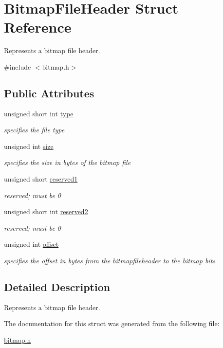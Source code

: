 \hypertarget{struct_bitmap_file_header}{}\section{Bitmap\+File\+Header Struct Reference}
\label{struct_bitmap_file_header}


Represents a bitmap file header.  




{\ttfamily \#include $<$bitmap.\+h$>$}

\subsection*{Public Attributes}
\begin{DoxyCompactItemize}
\item 
unsigned short int \mbox{\hyperlink{group__bitmap_ga0206e64e29930b0594e714cbdf8090f0}{type}}
\begin{DoxyCompactList}\small\item\em specifies the file type \end{DoxyCompactList}\item 
unsigned int \mbox{\hyperlink{group__bitmap_ga0dcad71d9b17783c4d296c2c6d00ede0}{size}}
\begin{DoxyCompactList}\small\item\em specifies the size in bytes of the bitmap file \end{DoxyCompactList}\item 
unsigned short \mbox{\hyperlink{group__bitmap_ga16d8cfe2edb9d109cea44ab94d1b701a}{reserved1}}
\begin{DoxyCompactList}\small\item\em reserved; must be 0 \end{DoxyCompactList}\item 
unsigned short int \mbox{\hyperlink{group__bitmap_ga24130729dee5b8b9c1bd45f0a73c9a9d}{reserved2}}
\begin{DoxyCompactList}\small\item\em reserved; must be 0 \end{DoxyCompactList}\item 
unsigned int \mbox{\hyperlink{group__bitmap_ga26ed598693b100ffd9e29c4dc77f3d92}{offset}}
\begin{DoxyCompactList}\small\item\em specifies the offset in bytes from the bitmapfileheader to the bitmap bits \end{DoxyCompactList}\end{DoxyCompactItemize}


\subsection{Detailed Description}
Represents a bitmap file header. 

The documentation for this struct was generated from the following file\+:\begin{DoxyCompactItemize}
\item 
\mbox{\hyperlink{bitmap_8h}{bitmap.\+h}}\end{DoxyCompactItemize}
